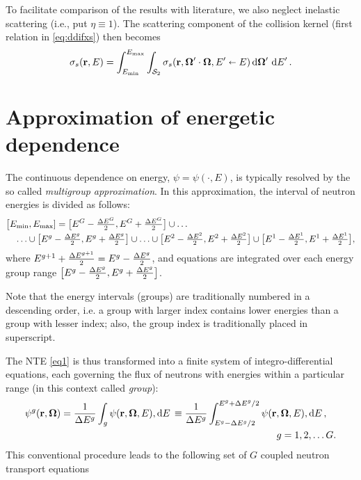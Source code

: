 To facilitate comparison of the results with literature, we also neglect inelastic scattering (i.e., put $\eta \equiv
1$). The scattering component of the collision kernel (first relation in \eqref{eq:ddifxs}) then becomes
\begin{equation}\label{eq:ddifxs2}
	\sigma_s(\br, E) =
\intE[']{\Emin}{\Emax}{\intA[']{\sigma_s(\br,\bomega'\cdot\bomega, E'\sla E)}}.
\end{equation}

\section{Approximation of energetic dependence}\label{sec:MG}
The continuous dependence on energy, $\psi = \psi(\cdot, E)$, is typically resolved by the so called \textit{multigroup
approximation}. In this approximation, the interval of neutron energies is divided as follows:
$$
\begin{multlined}
  \bigl[\Emin,\Emax] = \bigl[E^{G}-\dEh{G},E^{G}+\dEh{G}\bigr]\cup\ldots\\
  \ldots \cup \bigl[E^{g}-\dEh{g}, E^{g}+\dEh{g}\bigr] \cup \ldots \cup
  \bigl[E^2-\dEh{2},E^{2}+\dEh{2}\bigr] \cup \bigl[E^1-\dEh{1},E^{1}+\dEh{1}\bigr],
\end{multlined} 
$$
where $E^{g+1}+\dEh{g+1} = E^{g}-\dEh{g}$, and equations  are integrated over each energy group
range
\mbox{$\bigl[E^{g}-\dEh{g}, E^{g}+\dEh{g}\bigr]$}.
\begin{remark}
Note that the energy intervals (groups) are traditionally numbered in a descending order, i.e. a group with larger index
contains lower energies than a group with lesser index; also, the group index is traditionally placed in superscript. 
\end{remark}
The NTE \eqref{eq1} is thus transformed into a finite system of integro-differential equations, each
governing the flux of neutrons with energies within a particular range (in this context called \textit{group}):
\begin{equation}\label{eq:psi-MG}
\begin{multlined}
  \psi^g(\br, \bomega) = \frac{1}{\Delta E^{g}}\int_{g}\psi(\br, \bomega, E),\d{E} \equiv
  \frac{1}{\Delta E^{g}}\int_{E^g-\Delta E^{g}/2}^{E^g+\Delta E^{g}/2}\psi(\br, \bomega, E),\d{E},\\ g = 1, 2,\ldots
  G.
\end{multlined}
\end{equation} 
This conventional procedure leads to the following set of $G$ coupled neutron transport equations
